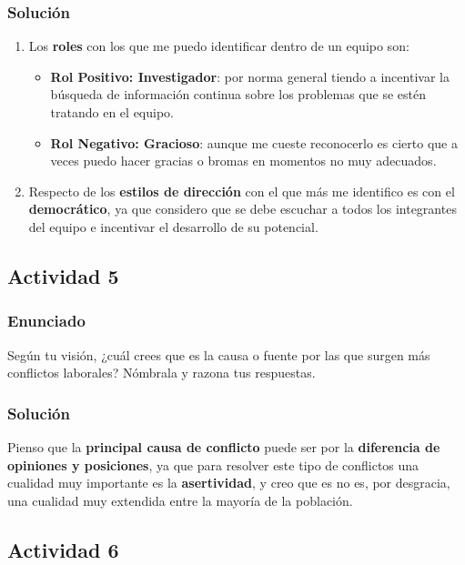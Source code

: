 \subsubsection{Solución}
\begin{enumerate}
    \item Los \textbf{roles} con los que me puedo identificar dentro de un equipo son:
    \begin{itemize}
        \item \textbf{Rol Positivo: Investigador}: por norma general tiendo a incentivar la búsqueda de información continua sobre los problemas que se estén tratando en el equipo.

        \item \textbf{Rol Negativo: Gracioso}: aunque me cueste reconocerlo es cierto que a veces puedo hacer gracias o bromas en momentos no muy adecuados.
    \end{itemize}
    \item Respecto de los \textbf{estilos de dirección} con el que más me identifico es con el \textbf{democrático}, ya que considero que se debe escuchar a todos los integrantes del equipo e incentivar el desarrollo de su potencial.
\end{enumerate}

\subsection{Actividad 5}

\subsubsection{Enunciado}
Según tu visión, ¿cuál crees que es la causa o fuente por las que surgen más conflictos laborales? Nómbrala y razona tus respuestas.

\subsubsection{Solución}
Pienso que la \textbf{principal causa de conflicto} puede ser por la \textbf{diferencia de opiniones y posiciones}, ya que para resolver este tipo de conflictos una cualidad muy importante es la \textbf{asertividad}, y creo que es no es, por desgracia, una cualidad muy extendida entre la mayoría de la población.

\subsection{Actividad 6}

